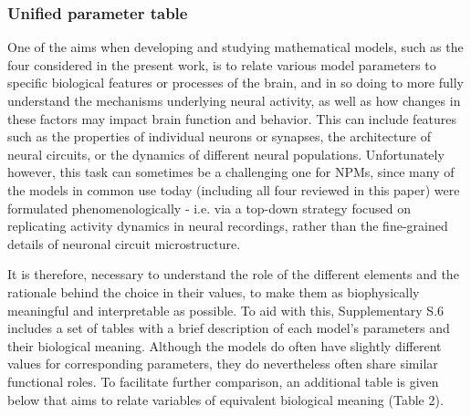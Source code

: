 \documentclass[12pt,twoside]{article}
\begin{document}
\subsubsection{Unified parameter table}
One of the aims when developing and studying mathematical models, such as the four considered in the present work, is to relate various model parameters to specific biological features or processes of the brain, and in so doing to more fully understand the mechanisms underlying neural activity, as well as how changes in these factors may impact brain function and behavior. This can include features such as the properties of individual neurons or synapses, the architecture of neural circuits, or the dynamics of different neural populations. Unfortunately however, this task can sometimes be a challenging one for NPMs, since many of the models in common use today (including all four reviewed in this paper) were formulated phenomenologically - i.e. via a top-down strategy focused on replicating activity dynamics in neural recordings, rather than the fine-grained details of neuronal circuit microstructure. 

It is therefore, necessary to understand the role of the different elements and the rationale behind the choice in their values, to make them as biophysically meaningful and interpretable as possible. To aid with this, Supplementary S.6 includes a set of tables with a brief description of each model's parameters and their biological meaning. Although the models do often have slightly different values for corresponding parameters, they do nevertheless often share similar functional roles. To facilitate further comparison, an additional table is given below that aims to relate variables of equivalent biological meaning (Table 2).
\end{document}
